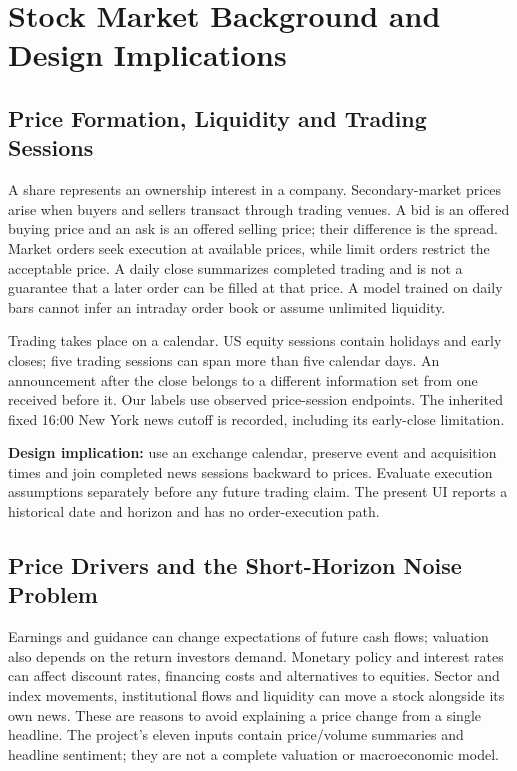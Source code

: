 \section*{Stock Market Background and Design Implications}
\label{sec:market-background}
\subsection*{Price Formation, Liquidity and Trading Sessions}
A share represents an ownership interest in a company\cite{sec_stocks}. Secondary-market prices arise when buyers and sellers transact through trading venues. A bid is an offered buying price and an ask is an offered selling price; their difference is the spread. Market orders seek execution at available prices, while limit orders restrict the acceptable price. A daily close summarizes completed trading and is not a guarantee that a later order can be filled at that price\cite{sec_orders,sec_execution,sec_participants}. A model trained on daily bars cannot infer an intraday order book or assume unlimited liquidity.

Trading takes place on a calendar. US equity sessions contain holidays and early closes; five trading sessions can span more than five calendar days\cite{nyse_calendar}. An announcement after the close belongs to a different information set from one received before it. Our labels use observed price-session endpoints. The inherited fixed 16:00 New York news cutoff is recorded, including its early-close limitation.

\textbf{Design implication:} use an exchange calendar, preserve event and acquisition times and join completed news sessions backward to prices. Evaluate execution assumptions separately before any future trading claim. The present UI reports a historical date and horizon and has no order-execution path.
\subsection*{Price Drivers and the Short-Horizon Noise Problem}
Earnings and guidance can change expectations of future cash flows; valuation also depends on the return investors demand. Monetary policy and interest rates can affect discount rates, financing costs and alternatives to equities. Sector and index movements, institutional flows and liquidity can move a stock alongside its own news\cite{sec_stocks,fidelity_business_cycle}. These are reasons to avoid explaining a price change from a single headline. The project's eleven inputs contain price/volume summaries and headline sentiment; they are not a complete valuation or macroeconomic model.

